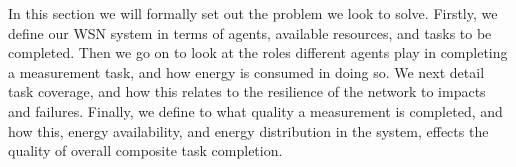 In this section we will formally set out the problem we look to solve. Firstly, we define our WSN system in terms of agents, available resources, and tasks to be completed. Then we go on to look at the roles different agents play in completing a measurement task, and how energy is consumed in doing so. We next detail task coverage, and how this relates to the resilience of the network to impacts and failures. Finally, we define to what quality a measurement is completed, and how this, energy availability, and energy distribution in the system, effects the quality of overall composite task completion. 